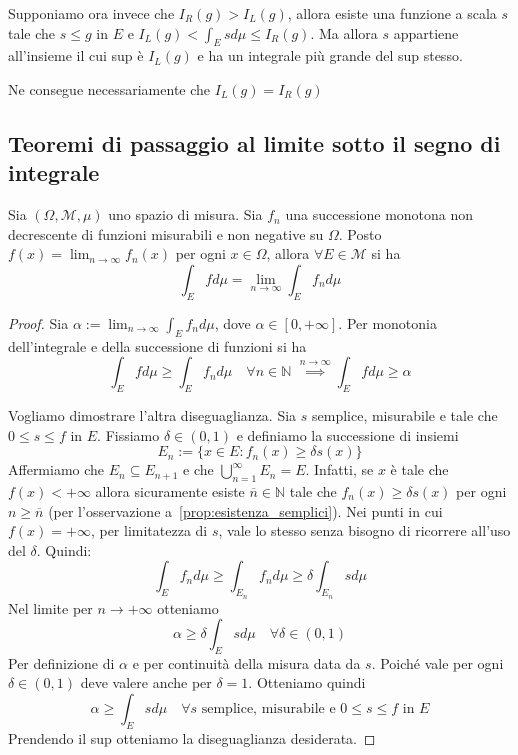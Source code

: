 Supponiamo ora invece che \(I_R{(g)} > I_L{(g)}\), allora esiste una funzione a
scala \(s\) tale che \(s \le g\) in \(E\) e \(I_L{(g)} < \int_E s d\mu \le
I_R{(g)}\). Ma allora \(s\) appartiene all'insieme il cui sup è \(I_L{(g)}\) e
ha un integrale più grande del sup stesso. 

Ne consegue necessariamente che \(I_L{(g)} = I_R{(g)}\) 

\subsection{Teoremi di passaggio al limite sotto il segno di integrale}
\begin{theorem}\label{th:beppo_levi_base}
Sia \((\Omega, \mathcal{M}, \mu)\) uno spazio di misura. Sia \(f_{n}\) una
successione monotona non decrescente di funzioni misurabili e non negative su \(\Omega\).
Posto \(f(x) = \lim_{n \to \infty} f_{n}(x)\) per ogni \(x \in \Omega\), allora
\(\forall E \in \mathcal{M}\) si ha
\[
    \int_E f d\mu = \lim_{n \to \infty} \int_E f_{n} d\mu
\]
\end{theorem}
\begin{proof}
    Sia \(\alpha := \lim_{n \to \infty} \int_E f_{n} d\mu\), dove \(\alpha \in [0,
    +\infty]\). Per monotonia dell'integrale e della successione di funzioni si ha 
    \[
        \int_E f d\mu \ge \int_E f_{n} d\mu \quad \forall n \in \mathbb{N}\,\,
        \overset{n\to \infty}{\implies }
        \int_E f d \mu \ge \alpha    
    \]
    
    Vogliamo dimostrare l'altra diseguaglianza. Sia \(s\) semplice,
    misurabile e tale che \(0 \le s \le f\) in \(E\). Fissiamo \(\delta \in (0,
    1)\) e definiamo la successione di insiemi
    \[
        E_{n} := \{ x \in E : f_{n}(x) \ge \delta s(x)\} 
    \]
    Affermiamo che \(E_{n} \subseteq E_{n+1}\) e che \(\bigcup_{n=1}^{\infty} E_{n}
    = E\). Infatti, se \(x\) è tale che \(f(x) < +\infty\) allora sicuramente esiste
    \(\overline{n} \in \mathbb{N}\) tale che \(f_{n}(x) \ge \delta s(x)\) per
    ogni \(n \ge \overline{n}\) (per l'osservazione a~\ref{prop:esistenza_semplici}). Nei punti in cui \(f(x) = +\infty\), per limitatezza di
    \(s\), vale lo stesso senza bisogno di ricorrere
    all'uso del \(\delta\).
    Quindi:
    \[
        \int_E f_{n} d\mu \ge \int_{E_{n}} f_{n} d\mu \ge \delta \int_{E_{n}} s
        d\mu
    \]
    Nel limite per \(n \to +\infty\) otteniamo
    \[
        \alpha \ge \delta \int_E s d\mu \quad \forall \delta \in (0, 1)
    \]
    Per definizione di \(\alpha\) e per continuità della misura data da \(s\).
    Poiché vale per ogni \(\delta \in (0, 1)\) deve valere anche per \(\delta
    = 1\). Otteniamo quindi
    \[
        \alpha \ge \int_E s d\mu \quad \forall s \text{ semplice, misurabile e }
        0 \le s \le f \text{ in } E
    \]
    Prendendo il sup otteniamo la diseguaglianza desiderata.
\end{proof}
